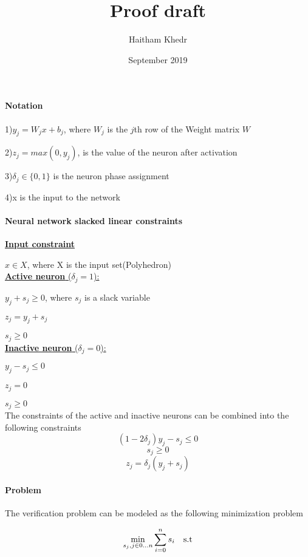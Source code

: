 \documentclass{article}
\title{Proof draft}
\author{Haitham Khedr }
\date{September 2019}
\begin{document}
\maketitle

\paragraph{Notation}\noindent

1)$y_j =W_jx + b_j$, where $W_j$ is the $j$th row of the Weight matrix $W$

2)$z_j = max(0,y_j)$, is the value of the neuron after activation

3)$\delta_j\in{\{0,1\}}$ is the neuron phase assignment

4)x is the input to the network

\paragraph{Neural network slacked linear constraints\\} \noindent

\underline{\textbf{Input constraint}}

$x\in X$, where X is the input set(Polyhedron)\\

\underline{\textbf{Active neuron} (\emph{$\delta_j = 1$}):}

$y_j + s_j \geq 0$, where $ s_j$ is a slack variable

$z_j = y_j + s_j $

$s_j \geq 0$\\

\underline{\textbf{Inactive neuron} (\emph{$\delta_j = 0$}):}

$y_j - s_j \leq 0$

$z_j =0$

$s_j \geq 0$\\

The constraints of the active and inactive neurons can be combined into the following constraints
$$(1-2\delta_j)y_j - s_j \leq 0$$
$$s_j \geq 0$$
$$z_j = \delta_j(y_j +s_j)$$
\newpage
\paragraph{Problem\\} 

The verification problem can be modeled as the following minimization problem

$$\min\limits_{s_j,j\in{0\dots n}}\displaystyle\sum_{i=0}^{n}s_i\text{\quad s.t}$$
\end{document}
